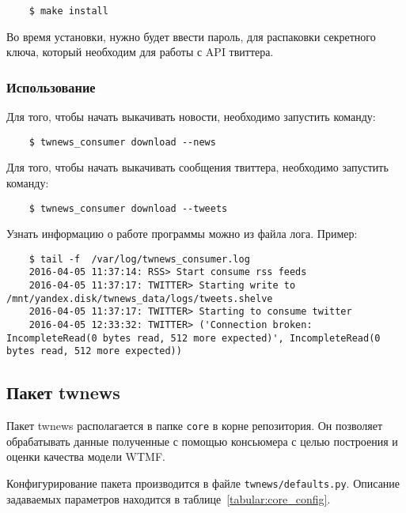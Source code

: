             \begin{lstlisting}
    $ make install
            \end{lstlisting}

            Во время установки, нужно будет ввести пароль, для распаковки секретного ключа, который необходим для работы с API твиттера.

        \subsubsection{Использование}
            Для того, чтобы начать выкачивать новости, необходимо запустить команду:
            \begin{lstlisting}
    $ twnews_consumer download --news
            \end{lstlisting}
            Для того, чтобы начать выкачивать сообщения твиттера, необходимо запустить команду:
            \begin{lstlisting}
    $ twnews_consumer download --tweets
            \end{lstlisting}

            Узнать информацию о работе программы можно из файла лога. Пример:
            \begin{lstlisting}
    $ tail -f  /var/log/twnews_consumer.log
    2016-04-05 11:37:14: RSS> Start consume rss feeds
    2016-04-05 11:37:17: TWITTER> Starting write to /mnt/yandex.disk/twnews_data/logs/tweets.shelve
    2016-04-05 11:37:17: TWITTER> Starting to consume twitter
    2016-04-05 12:33:32: TWITTER> ('Connection broken: IncompleteRead(0 bytes read, 512 more expected)', IncompleteRead(0 bytes read, 512 more expected))
            \end{lstlisting}

    \subsection{Пакет twnews}
        Пакет twnews располагается в папке \lstinline{core} в корне репозитория.
        Он позволяет обрабатывать данные полученные с помощью консьюмера с целью построения и оценки качества модели WTMF.

        Конфигурирование пакета производится в файле \lstinline{twnews/defaults.py}.
        Описание задаваемых параметров находится в таблице~\ref{tabular:core_config}.

